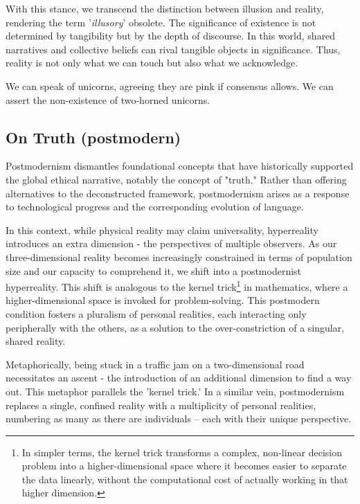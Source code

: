 \documentclass[11pt,a4]{article}
\begin{document}
        With this stance, we transcend the distinction between illusion and reality, rendering the term '\textit{illusory}' obsolete. The significance of existence is not determined by tangibility but by the depth of discourse. In this world, shared narratives and collective beliefs can rival tangible objects in significance. Thus, reality is not only what we can touch but also what we acknowledge.
        \par
        We can speak of unicorns, agreeing they are pink if consensus allows. We can assert the non-existence of two-horned unicorns.

    \subsection{On Truth (postmodern)}
    Postmodernism dismantles foundational concepts that have historically supported
    the global ethical narrative, notably the concept of "truth." Rather than
    offering alternatives to the deconstructed framework, postmodernism arises
    as a response to technological
    progress and the corresponding evolution of language.

    In this context, while physical reality may claim universality, hyperreality
    introduces an extra dimension - the perspectives of multiple observers.
    As our three-dimensional reality becomes increasingly constrained
    in terms of population size and our capacity to comprehend it,
    we shift into a postmodernist hyperreality. This shift is analogous
    to the kernel trick\footnote{In simpler terms, the kernel trick
    transforms a complex, non-linear decision problem into a
    higher-dimensional space where it becomes easier to separate
    the data linearly, without the computational cost of actually
    working in that higher dimension.
    } in mathematics, where a higher-dimensional space is invoked
    for problem-solving.
    This postmodern condition fosters a pluralism of personal realities,
    each interacting only peripherally with the others, as a solution to
    the over-constriction of a singular, shared reality.

    Metaphorically, being stuck in a traffic jam on a two-dimensional
    road necessitates an ascent - the introduction of an additional
    dimension to find a way out. This metaphor parallels the 'kernel trick.'
    In a similar vein, postmodernism replaces a single, confined reality
    with a multiplicity of personal realities, numbering as many as
    there are individuals – each with their unique perspective.
\end{document}
